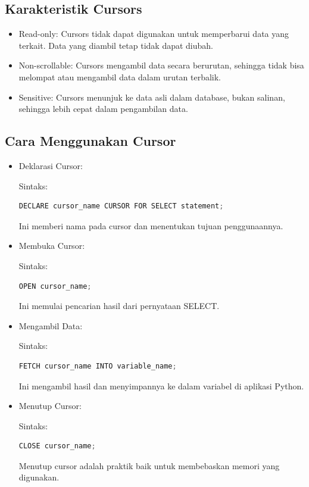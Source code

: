 \documentclass{article}
\begin{document}
\subsection{Karakteristik Cursors}
\begin{itemize}
      \item Read-only: Cursors tidak dapat digunakan untuk memperbarui data yang terkait. Data yang diambil tetap tidak dapat diubah.
      \item Non-scrollable: Cursors mengambil data secara berurutan, sehingga tidak bisa melompat atau mengambil data dalam urutan terbalik.
      \item Sensitive: Cursors menunjuk ke data asli dalam database, bukan salinan, sehingga lebih cepat dalam pengambilan data.
\end{itemize}

\subsection{Cara Menggunakan Cursor}
\begin{itemize}
      \item Deklarasi Cursor:

            Sintaks:
            \begin{lstlisting}[language=Python, caption={}, captionpos=b]
DECLARE cursor_name CURSOR FOR SELECT statement;
\end{lstlisting}
            Ini memberi nama pada cursor dan menentukan tujuan penggunaannya.
      \item Membuka Cursor:

            Sintaks:
            \begin{lstlisting}[language=Python, caption={}, captionpos=b]
OPEN cursor_name;
\end{lstlisting}
            Ini memulai pencarian hasil dari pernyataan SELECT.
      \item Mengambil Data:

            Sintaks:
            \begin{lstlisting}[language=Python, caption={}, captionpos=b]
FETCH cursor_name INTO variable_name;
\end{lstlisting}
            Ini mengambil hasil dan menyimpannya ke dalam variabel di aplikasi Python.
      \item Menutup Cursor:

            Sintaks:
            \begin{lstlisting}[language=Python, caption={}, captionpos=b]
CLOSE cursor_name;
\end{lstlisting}
            Menutup cursor adalah praktik baik untuk membebaskan memori yang digunakan.
\end{itemize}
\end{document}

